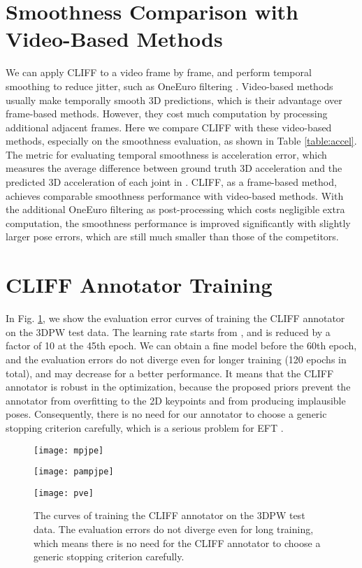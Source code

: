 \documentclass[runningheads]{llncs}
\begin{document}
\section{Smoothness Comparison with Video-Based Methods}
We can apply CLIFF to a video frame by frame, and perform temporal smoothing to reduce jitter, such as OneEuro filtering \cite{casiez20121}.
Video-based methods \cite{kanazawa2019learning,choi2021beyond,kocabas2020vibe,wan2021encoder} usually make temporally smooth 3D predictions, which is their advantage over frame-based methods.
However, they cost much computation by processing additional adjacent frames.
Here we compare CLIFF with these video-based methods, especially on the smoothness evaluation, as shown in Table \ref{table:accel}.
The metric for evaluating temporal smoothness is acceleration error, which measures the average difference between ground truth 3D acceleration and the predicted 3D acceleration of each joint in .
CLIFF, as a frame-based method, achieves comparable smoothness performance with video-based methods.
With the additional OneEuro filtering as post-processing which costs negligible extra computation, the smoothness performance is improved significantly with slightly larger pose errors, which are still much smaller than those of the competitors.

\section{CLIFF Annotator Training}

In Fig. \ref{fig:annotaor_curve},  we show the evaluation error curves of training the CLIFF annotator on the 3DPW test data.
The learning rate starts from , and is reduced by a factor of 10 at the 45th epoch.
We can obtain a fine model before the 60th epoch, and the evaluation errors do not diverge even for longer training (120 epochs in total), and may decrease for a better performance.
It means that the CLIFF annotator is robust in the optimization, because the proposed priors prevent the annotator from overfitting to the 2D keypoints and from producing implausible poses.
Consequently, there is no need for our annotator to choose a generic stopping criterion carefully, which is a serious problem for EFT \cite{joo2021exemplar}.

\begin{figure}[t]
	\begin{minipage}[t]{0.32\linewidth}
		\centering
		\texttt{[image: mpjpe]}
	\end{minipage}
	\begin{minipage}[t]{0.32\linewidth}
		\centering
		\texttt{[image: pampjpe]}
	\end{minipage}
	\begin{minipage}[t]{0.32\linewidth}
		\centering
		\texttt{[image: pve]}
	\end{minipage}
	\caption{The curves of training the CLIFF annotator on the 3DPW test data. The evaluation errors do not diverge even for long training, which means there is no need for the CLIFF annotator to choose a generic stopping criterion carefully.}
	\label{fig:annotaor_curve}
\end{figure}
\end{document}
